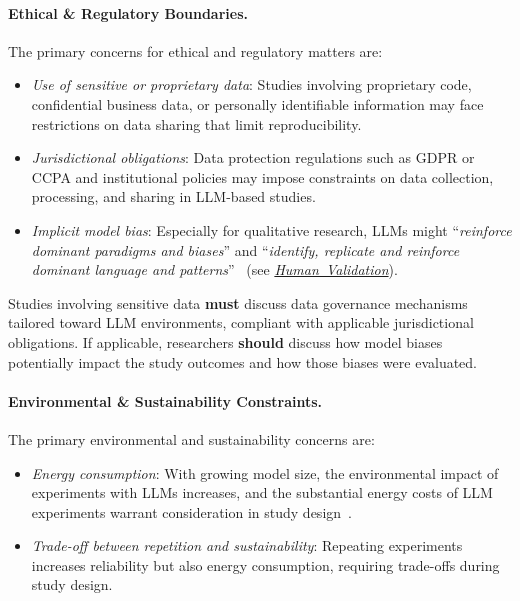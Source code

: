 \documentclass[smallextended]{svjour3}
\newcommand*{\enq}[1]{\enquote{{\itshape#1}}}
\newcommand{\must}{\textbf{must}\xspace}
\newcommand{\should}{\textbf{should}\xspace}
\newcommand{\humanvalidation}{\hyperref[sec:use-human-validation-for-llm-outputs]{\mbox{\emph{Human Validation}}}\xspace}
\newcommand{\humanvalidation}{\href{/guidelines/human-validation/}{\emph{Human Validation}}\xspace}
\newcommand{\guidelineparagraph}[1]{\paragraph{#1.}}
\newcommand{\guidelineparagraph}[1]{\paragraph{#1}}
\begin{document}
\guidelineparagraph{Ethical \& Regulatory Boundaries}
The primary concerns for ethical and regulatory matters are:
\begin{itemize}
    \item \emph{Use of sensitive or proprietary data}: Studies involving proprietary code, confidential business data, or personally identifiable information may face restrictions on data sharing that limit reproducibility.
    \item \emph{Jurisdictional obligations}: Data protection regulations such as GDPR or CCPA and institutional policies may impose constraints on data collection, processing, and sharing in LLM-based studies.
    \item \emph{Implicit model bias}: Especially for qualitative research, LLMs might \enq{reinforce dominant paradigms and biases} and \enq{identify, replicate and reinforce dominant language and patterns}~\cite{jowsey2025reject} (see \humanvalidation).
\end{itemize}

Studies involving sensitive data \must discuss data governance mechanisms tailored toward LLM environments, compliant with applicable jurisdictional obligations. If applicable, researchers \should discuss how model biases potentially impact the study outcomes and how those biases were evaluated.

\guidelineparagraph{Environmental \& Sustainability Constraints}
The primary environmental and sustainability concerns are:
\begin{itemize}
    \item \emph{Energy consumption}: With growing model size, the environmental impact of experiments with LLMs increases, and the substantial energy costs of LLM experiments warrant consideration in study design~\cite{DBLP:conf/acl/StrubellGM19}.
    \item \emph{Trade-off between repetition and sustainability}: Repeating experiments increases reliability but also energy consumption, requiring trade-offs during study design.
\end{itemize}
\end{document}
